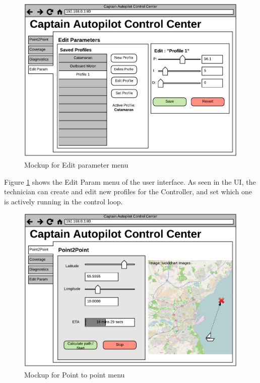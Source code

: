 \begin{figure}[H]
	\centering
	\includegraphics[width=1\linewidth]{Images/Requirements_specification/UI_Mockup_Edit_param.pdf}
	\caption{Mockup for Edit parameter menu}
	\label{fig:mockupparam}
\end{figure}

Figure \ref{fig:mockupparam} shows the Edit Param menu of the user interface. As seen in the UI, the technician can create and edit new profiles for the Controller, and set which one is actively running in the control loop. 

\begin{figure}[H]
	\centering
	\includegraphics[width=1\linewidth]{Images/Requirements_specification/UI_Mockup_Point_to_point.pdf}
	\caption{Mockup for Point to point menu}
	\label{fig:mockupp2p}
\end{figure}

